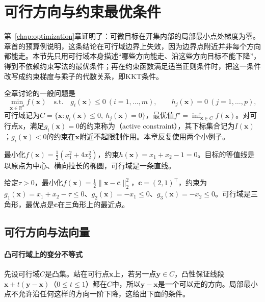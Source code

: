 \section{可行方向与约束最优条件}
\label{sec:opt-con-optimality}

第~\ref{chap:optimization}章证明了：可微目标在开集内部的局部最小点处梯度为零。章首的预算例说明，这条结论在可行域边界上失效，因为边界点附近并非每个方向都能走。本节先只用可行域本身描述“哪些方向能走、沿这些方向目标不能下降”，得到不依赖约束写法的最优条件；再在约束函数满足适当正则条件时，把这一条件改写成约束梯度与乘子的代数关系，即KKT条件。

全章讨论的一般问题是
\begin{equation}
\label{eq:opt-con-problem}
  \min_{\bm x\in\mathbb R^d}f(\bm x)
  \quad\text{s.t.}\quad
  g_i(\bm x)\leq0\ (i=1,\dots,m),\qquad
  h_j(\bm x)=0\ (j=1,\dots,p),
\end{equation}
可行域记为$C=\{\bm x:g_i(\bm x)\leq0,\ h_j(\bm x)=0\}$，最优值$f^\star=\inf_{\bm x\in C}f(\bm x)$。对可行点$\bm x$，满足$g_i(\bm x)=0$的约束称为（active constraint），其下标集合记为$I(\bm x)$；$g_i(\bm x)<0$的约束在$\bm x$附近不起限制作用。本章反复使用两个小例子。

\begin{example}[等式二次例]
\label{ex:opt-con-equality-qp}
最小化$f(\bm x)=\frac12(x_1^2+4x_2^2)$，约束$h(\bm x)=x_1+x_2-1=0$。目标的等值线是以原点为中心、横向拉长的椭圆，可行域是一条直线。
\end{example}

\begin{example}[预算分配例]
\label{ex:opt-con-budget}
给定$\tau>0$，最小化$f(\bm x)=\frac12\lVert\bm x-\bm c\rVert_2^2$，$\bm c=(2,1)^\top$，约束为$g_1(\bm x)=x_1+x_2-\tau\leq0$、$g_2(\bm x)=-x_1\leq0$、$g_3(\bm x)=-x_2\leq0$。可行域是三角形，最优点是$\bm c$在三角形上的最近点。
\end{example}

\subsection{可行方向与法向量}
\label{sec:opt-con-feasible-directions}

\paragraph{凸可行域上的变分不等式}
先设可行域$C$是凸集。站在可行点$\bm x$上，若另一点$\bm y\in C$，凸性保证线段$\bm x+t(\bm y-\bm x)$（$0\leq t\leq1$）都在$C$中，所以$\bm y-\bm x$是一个可以走的方向。局部最小点不允许沿任何这样的方向一阶下降，这给出下面的条件。

